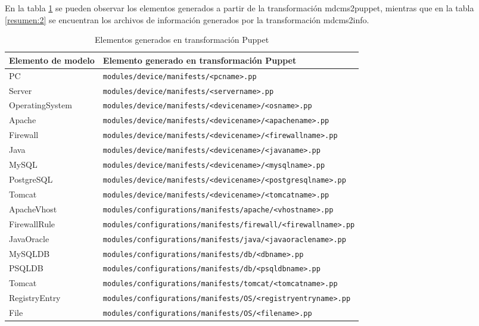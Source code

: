 En la tabla \ref{resumen:1} se pueden observar los elementos generados a partir de la transformación mdcms2puppet, mientras que en la tabla \ref{resumen:2} se encuentran los archivos de información generados por la transformación mdcms2info.
\begin{table}[H]
    \begin{adjustwidth}{-0.5in}{-1in}
        \centering
        \begin{center}
        \begin{tabular}{ll}
            Elemento de modelo & Elemento generado en transformación Puppet\\
            \hline
            PC & \texttt{modules/device/manifests/<pcname>.pp}\\
           Server & \texttt{modules/device/manifests/<servername>.pp}\\
            OperatingSystem & \texttt{modules/device/manifests/<devicename>/<osname>.pp}\\
           Apache & \texttt{modules/device/manifests/<devicename>/<apachename>.pp}\\
            Firewall & \texttt{modules/device/manifests/<devicename>/<firewallname>.pp}\\
            Java & \texttt{modules/device/manifests/<devicename>/<javaname>.pp}\\
            MySQL & \texttt{modules/device/manifests/<devicename>/<mysqlname>.pp}\\
            PostgreSQL & \texttt{modules/device/manifests/<devicename>/<postgresqlname>.pp}\\
            Tomcat & \texttt{modules/device/manifests/<devicename>/<tomcatname>.pp}\\
            ApacheVhost & \texttt{modules/configurations/manifests/apache/<vhostname>.pp}\\
            FirewallRule & \texttt{modules/configurations/manifests/firewall/<firewallname>.pp}\\
            JavaOracle & \texttt{modules/configurations/manifests/java/<javaoraclename>.pp}\\
            MySQLDB & \texttt{modules/configurations/manifests/db/<dbname>.pp}\\
            PSQLDB & \texttt{modules/configurations/manifests/db/<psqldbname>.pp}\\
            Tomcat & \texttt{modules/configurations/manifests/tomcat/<tomcatname>.pp}\\
            RegistryEntry & \texttt{modules/configurations/manifests/OS/<registryentryname>.pp}\\
            File & \texttt{modules/configurations/manifests/OS/<filename>.pp}  \\
        \end{tabular}
        \caption{Elementos generados en transformación Puppet}\label{resumen:1}
        \end{center}
    \end{adjustwidth}
\end{table}

